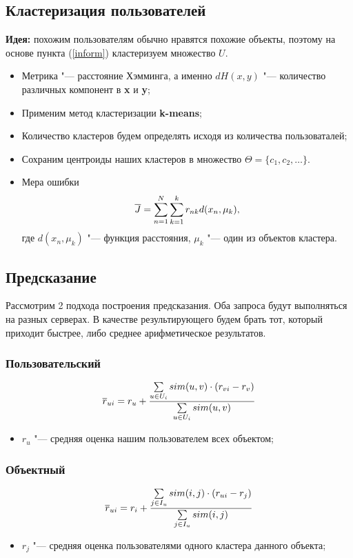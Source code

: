 \documentclass[a4paper,14pt]{article}
\begin{document}
\subsection{Кластеризация пользователей } 
{\bf Идея:} похожим пользователям обычно нравятся похожие объекты, поэтому на основе пункта (\ref{inform}) кластеризуем множество $U$.

\begin{itemize}
\item Метрика "--- расстояние Хэмминга, а именно $dH(x,y)$ "--- количество различных компонент в {\bf x} и {\bf y};
\item Применим метод кластеризации {\bf k-means};
\item Количество кластеров будем определять исходя из количества пользоваталей;
\item Сохраним центроиды наших кластеров в множество $\Theta = \{c_1, c_2, \dots\}$.
\item Мера ошибки
\[
{\overline{J}} = \sum\limits_{n=1}^N \sum\limits_{k=1}^k r_{nk} d(x_n,\mu_k),
\]
где $d(x_n,\mu_k)$ "--- функция расстояния, 
$\mu_k$ "--- один из объектов кластера.
\end{itemize}
\subsection{Предсказание}
Рассмотрим 2 подхода построения предсказания. Оба запроса будут выполняться на разных серверах. В качестве результирующего будем брать тот, который приходит быстрее, либо среднее арифметическое результатов.
\subsubsection{Пользовательский}
\[
\overline{r}_{ui} = r_{u} + \frac{\sum\limits_{u\in U_i} sim(u,v)\cdot(r_{vi} - r_v)}{\sum\limits_{u\in U_i} sim(u,v)}
\]
\begin{itemize}
\item $r_u$ "--- средняя оценка нашим пользователем всех объектом;
\end{itemize}
\subsubsection{Объектный}
\[
\overline{r}_{ui} = r_{i} + \frac{\sum\limits_{j\in I_u} sim(i,j)\cdot(r_{ui} - r_j)}{\sum\limits_{j\in I_u} sim(i,j)}
\]
\begin{itemize}
\item $r_j$ "--- средняя оценка пользователями одного кластера данного объекта;
\end{itemize}
\end{document}
